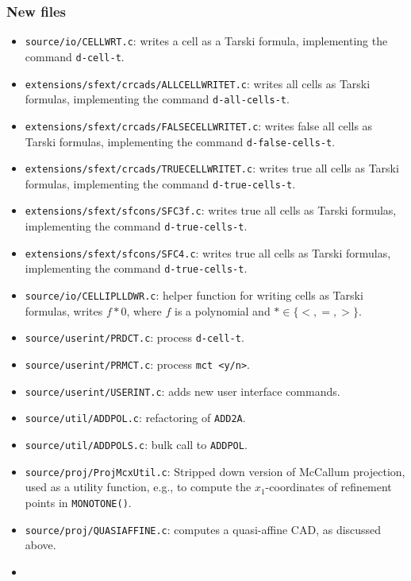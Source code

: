 \documentclass[
]{book}
\theoremstyle{definition}
\theoremstyle{definition}
\theoremstyle{definition}
\theoremstyle{definition}
\theoremstyle{remark}
\begin{document}
\hypertarget{new-files}{%
\subsubsection{New files}\label{new-files}}

\begin{itemize}
\item
  \texttt{source/io/CELLWRT.c}: writes a cell as a Tarski formula, implementing the command \texttt{d-cell-t}.
\item
  \texttt{extensions/sfext/crcads/ALLCELLWRITET.c}: writes all cells as Tarski formulas, implementing the command \texttt{d-all-cells-t}.
\item
  \texttt{extensions/sfext/crcads/FALSECELLWRITET.c}: writes false all cells as Tarski formulas, implementing the command \texttt{d-false-cells-t}.
\item
  \texttt{extensions/sfext/crcads/TRUECELLWRITET.c}: writes true all cells as Tarski formulas, implementing the command \texttt{d-true-cells-t}.
\item
  \texttt{extensions/sfext/sfcons/SFC3f.c}: writes true all cells as Tarski formulas, implementing the command \texttt{d-true-cells-t}.
\item
  \texttt{extensions/sfext/sfcons/SFC4.c}: writes true all cells as Tarski formulas, implementing the command \texttt{d-true-cells-t}.
\item
  \texttt{source/io/CELLIPLLDWR.c}: helper function for writing cells as Tarski formulas, writes \(f * 0\), where \(f\) is a polynomial and \(* \in \{ <, =, > \}\).
\item
  \texttt{source/userint/PRDCT.c}: process \texttt{d-cell-t}.
\item
  \texttt{source/userint/PRMCT.c}: process \texttt{mct\ \textless{}y/n\textgreater{}}.
\item
  \texttt{source/userint/USERINT.c}: adds new user interface commands.
\item
  \texttt{source/util/ADDPOL.c}: refactoring of \texttt{ADD2A}.
\item
  \texttt{source/util/ADDPOLS.c}: bulk call to \texttt{ADDPOL}.
\item
  \texttt{source/proj/ProjMcxUtil.c}: Stripped down version of McCallum projection, used as a utility function, e.g., to compute the \(x_1\)-coordinates of refinement points in \texttt{MONOTONE()}.
\item
  \texttt{source/proj/QUASIAFFINE.c}: computes a quasi-affine CAD, as discussed above.
\item

\end{itemize}
\end{document}
